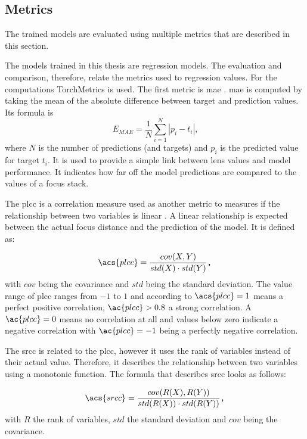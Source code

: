 \subsection{Metrics}
\label{sec:Methods:Evaluation:Metrics}

The trained models are evaluated using multiple metrics that are described in this section.

The models trained in this thesis are regression models. The evaluation and comparison, therefore, relate the metrics used to regression values. For the computations TorchMetrics \cite{2022pytorchmetrics} is used. The first metric is \ac{mae} . \Ac{mae} is computed by taking the mean of the absolute difference between target and prediction values. Its formula is \begin{equation} E_{MAE} = \frac{1}{N}\sum_{i=1}^N |p_i - t_i| \text{,} \end{equation} where $N$ is the number of predictions (and targets) and $p_i$ is the predicted value for target $t_i$.
It is used to provide a simple link between lens values and model performance. It indicates how far off the model predictions are compared to the values of a focus stack.

The \ac{plcc} \cite{pearson1909determination} is a correlation measure used as another metric to measures if the relationship between two variables is linear \cite{profillidis2019statistical}. A linear relationship is expected between the actual focus distance and the prediction of the model. It is defined as:

\begin{equation} \acs{plcc} = \frac{cov(X,Y)}{std(X) \cdot std(Y)} \texttt{,} \end{equation}
with $cov$ being the covariance and $std$ being the standard deviation. The value range of \ac{plcc} ranges from $-1$ to $1$ and according to \textcite{profillidis2019statistical} $\acs{plcc} = 1$ means a perfect positive correlation, $\ac{plcc} > 0.8$ a strong correlation. A $\ac{plcc} = 0$ means no correlation at all and values below zero indicate a negative correlation with $\ac{plcc} = -1$ being a perfectly negative correlation.


The \ac{srcc} \cite{spearman1904proof} is related to the \ac{plcc}, however it uses the rank of variables instead of their actual value. Therefore, it describes the relationship between two variables using a monotonic function. The formula that describes \ac{srcc} looks as follows:

\begin{equation} \acs{srcc} = \frac{cov(R(X),R(Y))}{std(R(X)) \cdot std(R(Y))} \texttt{,} \end{equation} with $R$ the rank of variables, $std$ the standard deviation and $cov$ being the covariance.

